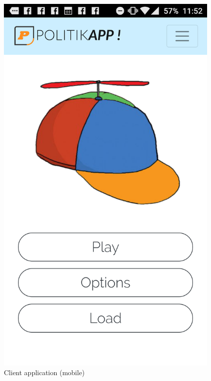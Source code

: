 \documentclass[paper=a4,fontsize=11pt]{article}
\begin{document}
\begin{figure}[H]
  \caption{Client application (mobile)}
	\hfill\includegraphics[width=11cm]{Walkthrough/Mobile_menu.PNG}\hspace*{\fill}
\end{figure}
\end{document}
